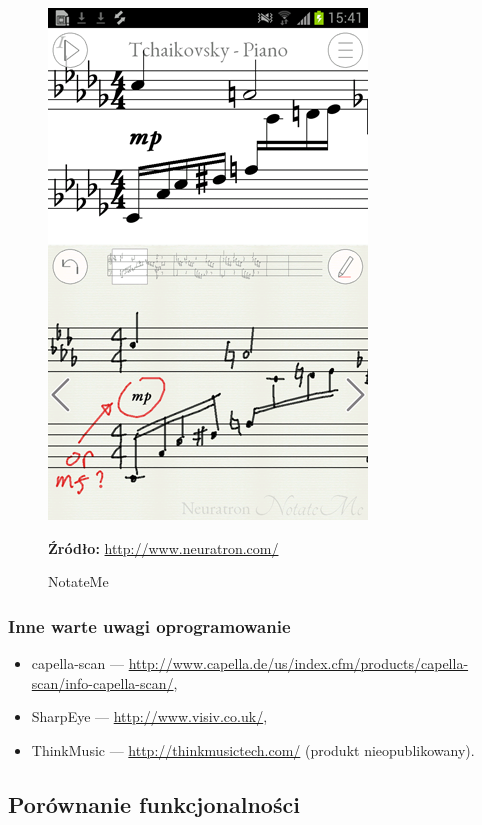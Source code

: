 \documentclass[polish,thesis,12pt]{dcsbook}
\newcommand{\source}[2]{
  	\caption*{\textbf{Źródło:} \href{#1}{{#2}}}
}
\begin{document}
\begin{figure}[H]
  \centering
  \includegraphics[scale=0.5,bb=0 0 320 512]{img/notateme.png}
  \caption{NotateMe}
  \label{notateme}
  \source{http://www.neuratron.com/notateme.html}{http://www.neuratron.com/}
\end{figure}

\subsubsection{Inne warte uwagi oprogramowanie}
\begin{itemize}
  \item capella-scan --- \url{http://www.capella.de/us/index.cfm/products/capella-scan/info-capella-scan/},
  \item SharpEye --- \url{http://www.visiv.co.uk/},
  \item ThinkMusic --- \url{http://thinkmusictech.com/} (produkt nieopublikowany).
\end{itemize}

\subsection{Porównanie funkcjonalności}
\end{document}
